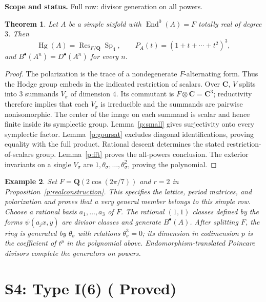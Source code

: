 \documentclass[11pt,reqno]{article}
\theoremstyle{emphasizedplain}
\DeclareRobustCommand{\provedstatus}{%
  \texorpdfstring{\textcolor{ProvedGreen}{\textbf{Proved}}}{Proved}}
\newtheorem{theorem}{Theorem}[section]
\theoremstyle{emphasizeddefinition}
\newtheorem{example}[theorem]{Example}
\theoremstyle{emphasizeddefinition}
\DeclareMathOperator{\End}{End}
\DeclareMathOperator{\Hg}{Hg}
\DeclareMathOperator{\Sp}{Sp}
\DeclareMathOperator{\Res}{Res}
\newcommand{\Q}{\mathbf Q}
\newcommand{\C}{\mathbf C}
\newcommand{\B}{B}
\newcommand{\D}{D}
\newcommand{\status}[1]{%
  \par\nobreak\smallskip\noindent
  {\setlength{\fboxsep}{7pt}%
   \colorbox{ScopeBackground}{%
    \parbox{\dimexpr\linewidth-2\fboxsep\relax}{%
     \small\textbf{\textcolor{HeadingInk}{Scope and status.}} #1}}}%
  \par\nobreak\medskip}
\begin{document}
\status{Full row: divisor generation on all powers.}
\begin{theorem}
Let $A$ be a simple sixfold with $\End^0(A)=F$ totally real of degree $3$.
Then
\[
 \Hg(A)=\Res_{F/\Q}\Sp_{4},\qquad
 P_A(t)=(1+t+\cdots+t^{2})^{3},
\]
and $\B^\bullet(A^n)=\D^\bullet(A^n)$ for every $n$.
\end{theorem}
\begin{proof}
The polarization is the trace of a nondegenerate $F$-alternating form.
Thus the Hodge group embeds in the indicated restriction of scalars.
Over $\C$, $V$ splits into $3$ summands $V_\sigma$ of dimension $4$.
Its commutant is $F\otimes\C=\C^{3}$; reductivity therefore implies that
each $V_\sigma$ is irreducible and the summands are pairwise nonisomorphic.
The center of the image on each summand is scalar and hence finite inside
its symplectic group. Lemma~\ref{p:small} gives surjectivity onto every
symplectic factor. Lemma~\ref{p:goursat} excludes diagonal identifications,
proving equality with the full product. Rational descent determines the
stated restriction-of-scalars group. Lemma~\ref{p:fft} proves the all-powers
conclusion. The exterior invariants on a single $V_\sigma$ are
$1,\theta_\sigma,\ldots,\theta_\sigma^{2}$, proving the polynomial.
\end{proof}
\begin{example}
Set $F=\Q(2\cos(2\pi/7))$ and $r=2$ in
Proposition~\ref{p:realconstruction}. This specifies the lattice, period
matrices, and polarization and proves that a very general member belongs
to this simple row. Choose a rational basis $a_1,\ldots,a_{3}$ of $F$.
The rational $(1,1)$ classes defined by the forms
$\psi(a_jx,y)$ are divisor classes and generate $\B^\bullet(A)$.
After splitting $F$, the ring is generated by $\theta_\sigma$ with
relations $\theta_\sigma^{3}=0$; its dimension in codimension $p$ is the
coefficient of $t^p$ in the polynomial above. Endomorphism-translated
Poincare divisors complete the generators on powers.
\end{example}
\section{S4: Type I(6) (\provedstatus)}\label{sec:S4}
\end{document}
